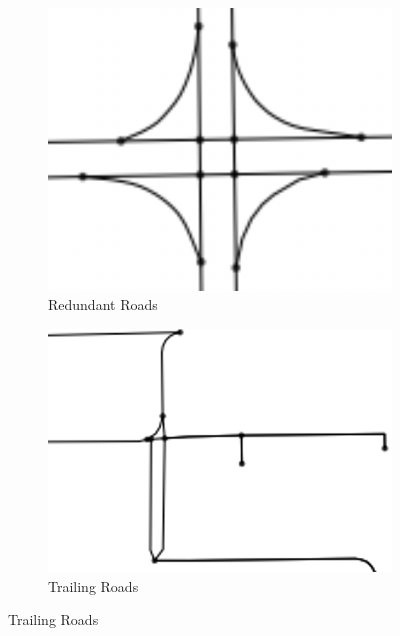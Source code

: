 \begin{figure}[htb]
  \centering
  \caption{Four simplification cases.}
  \label{fig: simplification}
  \begin{subfigure}[t]{0.22\linewidth}
      \centering
      \includegraphics[width=\textwidth]{images/crossroad.png}
      \caption{Redundant Roads}
      \label{fig: redundant_roads}
  \end{subfigure}
  \begin{subfigure}[t]{0.22\linewidth}
      \centering
      \includegraphics[width=\textwidth]{images/trailing_road.png}
      \caption{Trailing Roads}
      \label{fig: trailing_road}
  \end{subfigure}

\end{figure}

